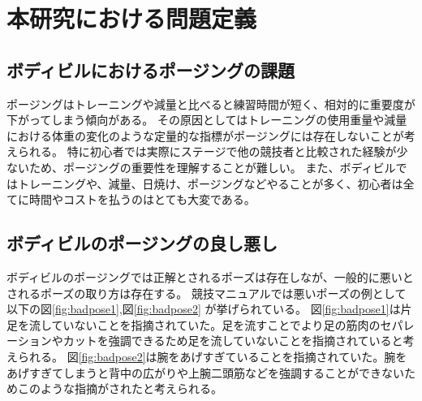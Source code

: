 \chapter{本研究における問題定義}
\label{issue}

\section{ボディビルにおけるポージングの課題}
ポージングはトレーニングや減量と比べると練習時間が短く、相対的に重要度が下がってしまう傾向がある。
その原因としてはトレーニングの使用重量や減量における体重の変化のような定量的な指標がポージングには存在しないことが考えられる。
特に初心者では実際にステージで他の競技者と比較された経験が少ないため、ポージングの重要性を理解することが難しい。
また、ボディビルではトレーニングや、減量、日焼け、ポージングなどやることが多く、初心者は全てに時間やコストを払うのはとても大変である。
\section{ボディビルのポージングの良し悪し}
ボディビルのポージングでは正解とされるポーズは存在しなが、一般的に悪いとされるポーズの取り方は存在する。
競技マニュアル\cite{JBBF2023}では悪いポーズの例として以下の図\ref{fig:badpose1},図\ref{fig:badpose2} が挙げられている。
図\ref{fig:badpose1}は片足を流していないことを指摘されていた。足を流すことでより足の筋肉のセパレーションやカットを強調できるため足を流していないことを指摘されていると考えられる。
図\ref{fig:badpose2}は腕をあげすぎていることを指摘されていた。腕をあげすぎてしまうと背中の広がりや上腕二頭筋などを強調することができないためこのような指摘がされたと考えられる。

